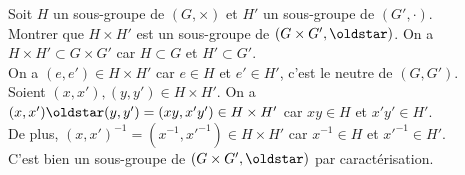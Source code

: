 \documentclass[11pt]{article}
\begin{document}
\begin{ex}{}{}
    Soit $H$ un sous-groupe de $(G,\times)$ et $H'$ un sous-groupe de $(G',\cdot)$.\\
    Montrer que $H\times H'$ est un sous-groupe de $(G\times G', \oldstar)$.
    \tcblower
    On a $H\times H'\subset G\times G'$ car $H\subset G$ et $H'\subset G'$.\\
    On a $(e,e')\in H\times H'$ car $e\in H$ et $e'\in H'$, c'est le neutre de $(G,G')$.\\
    Soient $(x,x'),(y,y')\in H\times H'$. On a $(x,x')\oldstar(y,y')=(xy,x'y')\in H\times H'$ car $xy\in H$ et $x'y'\in H'$.\\
    De plus, $(x,x')^{-1}=(x^{-1},x'^{-1})\in H\times H'$ car $x^{-1}\in H$ et $x'^{-1}\in H'$.\\
    C'est bien un sous-groupe de $(G\times G',\oldstar)$ par caractérisation.
\end{ex}

\pagebreak
\end{document}
